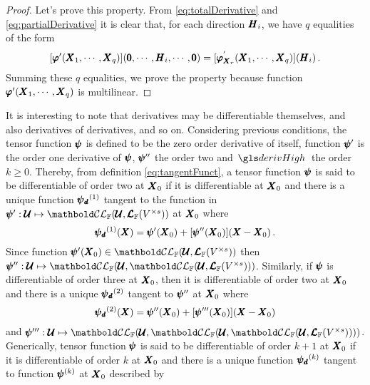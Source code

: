 {\footnotesize
\begin{proof}
Let's prove this property. From \eqref{eq:totalDerivative} and \eqref{eq:partialDerivative} it is clear that, for each direction $\pmb{H}_i$, we have $q$ equalities of the form
\begin{equation*}
[\pmb{\varphi}'(\pmb{X}_1,\cdots,\pmb{X}_q)](\pmb{0},\cdots,\pmb{H}_i,\cdots,\pmb{0})=[\pmb{\varphi}_{\pmb{X}_r}^{'}(\pmb{X}_1,\cdots,\pmb{X}_q)]{(\pmb{H}_i)}\,.
\end{equation*}
Summing these $q$ equalities, we prove the property because function $\pmb{\varphi}'(\pmb{X}_1,\cdots,\pmb{X}_q)$ is multilinear.
\end{proof}}



It is interesting to note that derivatives may be differentiable themselves, and also derivatives of derivatives, and so on. Considering previous conditions, the tensor function $\pmb{\psi}$ is defined to be the zero order derivative of itself, function $\pmb{\psi}'$ is the order one derivative of $\pmb{\psi}$, $\pmb{\psi}''$ the order two and $\gloref{derivHigh}$ the order $k\geqslant 0$. Thereby, from definition \eqref{eq:tangentFunct}, a tensor function $\pmb{\psi}$ is said to be differentiable of order two at $\pmb{X}_0$ if it is differentiable at $\pmb{X}_0$ and there is a unique function $\pmb{\psi_\mathit{d}}^{(1)}$ tangent to the function in $\map{\tnr{\psi}'}{\pmb{\mathcal{U}}}{\evlc{\cam{F}}{\pmb{\mathcal{U}}}{\ete{\cam{F}}{V^{\times s}}}}$ at $\pmb{X}_0$ where
\begin{equation*}
\pmb{\psi_\mathit{d}}^{(1)}(\pmb{X})=\pmb{\psi}'(\pmb{X}_0)+[\pmb{\psi}''(\pmb{X}_0)](\pmb{X}-\pmb{X}_0)\,.
\end{equation*}
Since function $\fua{\tnr{\psi}'}{\tnr{X}_0}\in\evlc{\cam{F}}{\pmb{\mathcal{U}}}{\ete{\cam{F}}{V^{\times s}}}$ then  $\map{\tnr{\psi}''}{\pmb{\mathcal{U}}}{\evlc{\cam{F}}{\pmb{\mathcal{U}}}{\evlc{\cam{F}}{\pmb{\mathcal{U}}}{\ete{\cam{F}}{V^{\times s}}}}}$. Similarly, if $\pmb{\psi}$ is differentiable of order three at $\pmb{X}_0$, then it is differentiable of order two at $\pmb{X}_0$ and there is a unique $\pmb{\psi_\mathit{d}}^{(2)}$ tangent to $\pmb{\psi}''$ at $\pmb{X}_0$ where
\begin{equation*}
\pmb{\psi_\mathit{d}}^{(2)}(\pmb{X})=\pmb{\psi}''(\pmb{X}_0)+[\pmb{\psi}'''(\pmb{X}_0)](\pmb{X}-\pmb{X}_0)
\end{equation*}
and $\map{\tnr{\psi}'''}{\pmb{\mathcal{U}}}{\evlc{\cam{F}}{\pmb{\mathcal{U}}}{\evlc{\cam{F}}{\pmb{\mathcal{U}}}{\evlc{\cam{F}}{\pmb{\mathcal{U}}}{\ete{\cam{F}}{V^{\times s}}}}}}$. Generically, tensor function $\pmb{\psi}$ is said to be differentiable of order $k+1$ at $\pmb{X}_0$ if it is differentiable of order $k$ at $\pmb{X}_0$ and there is a unique function $\pmb{\psi_\mathit{d}}^{(k)}$ tangent to function $\pmb{\psi}^{(k)}$ at $\pmb{X}_0$ described by
